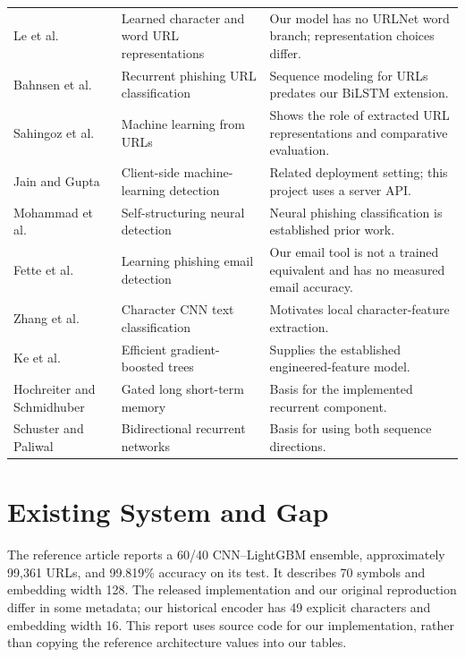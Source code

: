 \begin{singlespace}
\begin{longtable}{p{}p{}p{}}
Le et al. \cite{le2018urlnet} & Learned character and word URL representations & Our model has no URLNet word branch; representation choices differ.\\
Bahnsen et al. \cite{bahnsen2017rnn} & Recurrent phishing URL classification & Sequence modeling for URLs predates our BiLSTM extension.\\
Sahingoz et al. \cite{sahingoz2019machine} & Machine learning from URLs & Shows the role of extracted URL representations and comparative evaluation.\\
Jain and Gupta \cite{jain2018client} & Client-side machine-learning detection & Related deployment setting; this project uses a server API.\\
Mohammad et al. \cite{mohammad2014predicting} & Self-structuring neural detection & Neural phishing classification is established prior work.\\
Fette et al. \cite{fette2007email} & Learning phishing email detection & Our email tool is not a trained equivalent and has no measured email accuracy.\\
Zhang et al. \cite{zhang2015character} & Character CNN text classification & Motivates local character-feature extraction.\\
Ke et al. \cite{ke2017lightgbm} & Efficient gradient-boosted trees & Supplies the established engineered-feature model.\\
Hochreiter and Schmidhuber \cite{lstm} & Gated long short-term memory & Basis for the implemented recurrent component.\\
Schuster and Paliwal \cite{brnn} & Bidirectional recurrent networks & Basis for using both sequence directions.\\\bottomrule
\end{longtable}\end{singlespace}

\section{Existing System and Gap}
The reference article reports a 60/40 CNN--LightGBM ensemble, approximately 99,361 URLs, and 99.819\% accuracy on its test. It describes 70 symbols and embedding width 128. The released implementation and our original reproduction differ in some metadata; our historical encoder has 49 explicit characters and embedding width 16. This report uses source code for our implementation, rather than copying the reference architecture values into our tables.

